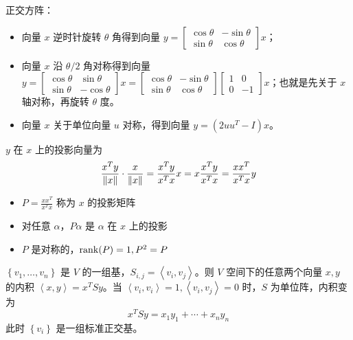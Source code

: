 \begin{remark}
    正交方阵：
    \begin{itemize}
        \item 向量 $x$ 逆时针旋转 $\theta$ 角得到向量 $y = \begin{bmatrix}
            \cos\theta & -\sin\theta \\ 
            \sin\theta & \cos\theta
        \end{bmatrix}x$；
        \item 向量 $x$ 沿 $\theta/2$ 角对称得到向量 $y = \begin{bmatrix}
            \cos\theta & \sin\theta \\ 
            \sin\theta & -\cos\theta
        \end{bmatrix}x = \begin{bmatrix}
            \cos\theta & -\sin\theta \\ 
            \sin\theta & \cos\theta
        \end{bmatrix}\begin{bmatrix}
            1 & 0 \\
            0 & -1
        \end{bmatrix}x$；也就是先关于 $x$ 轴对称，再旋转 $\theta$ 度。
        \item 向量 $x$ 关于单位向量 $u$ 对称，得到向量 $y = (2uu^T-I)x$。
    \end{itemize}
\end{remark}

\begin{remark}
    $y$ 在 $x$ 上的投影向量为 \[\frac{x^{T} y}{\norm{x}} \cdot \frac{x}{\norm{x}}=\frac{x^{T} y}{x^{T} x} x=x \frac{x^{T} y}{x^{T} x}=\frac{x x^{T}}{x^{T} x} y\]
    \begin{itemize}
        \item $P = \frac{x x^{T}}{x^{T} x}$ 称为 $x$ 的投影矩阵
        \item 对任意 $\alpha$，$P\alpha$ 是 $\alpha$ 在 $x$ 上的投影
        \item $P$ 是对称的，$\rank(P) = 1, P^2 = P$
    \end{itemize}
\end{remark}

\begin{remark}
    $\left\{v_1, \dots, v_n\right\}$ 是 $V$ 的一组基，$S_{i, j} = \left\langle v_{i}, v_{j}\right\rangle$。则 $V$ 空间下的任意两个向量 $x, y$ 的内积 $\left\langle x, y\right\rangle=x^TSy$。当 $\left\langle v_{i}, v_{i}\right\rangle = 1, \left\langle v_{i}, v_{j}\right\rangle = 0$ 时，$S$ 为单位阵，内积变为 \[x^TSy = x_1y_1 + \cdots + x_ny_n\]
    此时 $\left\{v_i\right\}$ 是一组标准正交基。
\end{remark}

